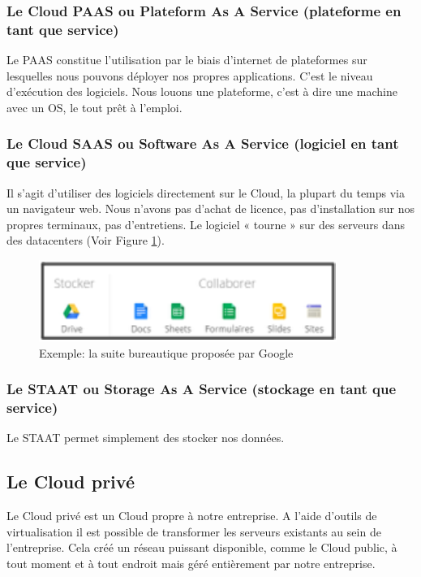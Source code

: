 \documentclass{report}
\begin{document}
      \subsubsection{Le Cloud PAAS ou Plateform As A Service (plateforme en tant que service)}
      Le PAAS constitue l’utilisation par le biais d’internet de plateformes sur lesquelles nous pouvons déployer nos propres applications. C’est le niveau d’exécution des logiciels. Nous louons une plateforme, c’est à dire une machine avec un OS, le tout prêt à l’emploi.

      \subsubsection{Le Cloud SAAS ou Software As A Service (logiciel en tant que service)}
      Il s’agit d’utiliser des logiciels directement sur le Cloud, la plupart du temps via un navigateur web. Nous n’avons pas d’achat de licence, pas d’installation sur nos propres terminaux, pas d’entretiens. Le logiciel « tourne » sur des serveurs dans des datacenters (Voir Figure \ref{Google Cloud}).

      \begin{figure}
        \begin{center}
          \includegraphics[scale=1]{images/googleDrive.png}
        \end{center}
        \caption{Exemple: la suite bureautique proposée par Google}
        \label{Google Cloud}
      \end{figure}

      \subsubsection{Le STAAT ou Storage As A Service (stockage en tant que service)}
      Le STAAT permet simplement des stocker nos données.

    \subsection{Le Cloud privé}
    Le Cloud privé est un Cloud propre à notre entreprise. A l’aide d’outils de virtualisation il est possible de transformer les serveurs existants au sein de l’entreprise. Cela créé un réseau puissant disponible, comme le Cloud public, à tout moment et à tout endroit mais géré entièrement par notre entreprise.
\end{document}
